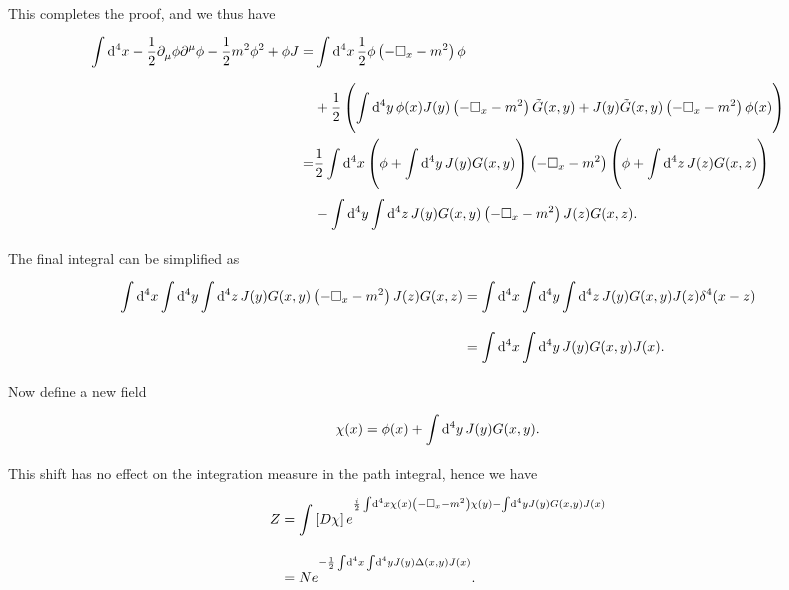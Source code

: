 This completes the proof, and we thus have
\begin{align*}
	\int\limits_{}^{}\dd[4]{x}-\frac{1}{2}\partial^{}_{\mu}\phi\partial^{\mu}_{}\phi - \frac{1}{2}m^{2}\phi^{2} + \phi J =& \int\limits_{}^{}\dd[4]{x}\frac{1}{2}\phi\left(-\square_{x} - m^{2}\right)\phi \\
	&+ \frac{1}{2}\left(\int\limits_{}^{}\dd[4]{y}\phi(x)J(y)\left(-\square_{x} - m^{2}\right)\tilde{G}(x, y) + J(y)\tilde{G}(x, y)\left(-\square_{x} - m^{2}\right)\phi(x)\right) \\
	=& \frac{1}{2}\int\limits_{}^{}\dd[4]{x}\left(\phi + \int\limits_{}^{}\dd[4]{y}J(y)G(x, y)\right)\left(-\square_{x} - m^{2}\right)\left(\phi + \int\limits_{}^{}\dd[4]{z}J(z)G(x, z)\right) \\
	 &- \int\limits_{}^{}\dd[4]{y}\int\limits_{}^{}\dd[4]{z}J(y)G(x, y)\left(-\square_{x} - m^{2}\right)J(z)G(x, z).
\end{align*}
The final integral can be simplified as
\begin{align*}
	\int\limits_{}^{}\dd[4]{x}\int\limits_{}^{}\dd[4]{y}\int\limits_{}^{}\dd[4]{z}J(y)G(x, y)\left(-\square_{x} - m^{2}\right)J(z)G(x, z) &= \int\limits_{}^{}\dd[4]{x}\int\limits_{}^{}\dd[4]{y}\int\limits_{}^{}\dd[4]{z}J(y)G(x, y)J(z)\delta^{4}(x - z) \\
	                           &= \int\limits_{}^{}\dd[4]{x}\int\limits_{}^{}\dd[4]{y}J(y)G(x, y)J(x).
\end{align*}
Now define a new field
\begin{align*}
	\chi(x) = \phi(x) + \int\limits_{}^{}\dd[4]{y}J(y)G(x, y).
\end{align*}
This shift has no effect on the integration measure in the path integral, hence we have
\begin{align*}
	Z &= \int\limits_{}\left[D\chi\right]e^{\frac{i}{2}\int\limits_{}^{}\dd[4]{x}\chi(x)\left(-\square_{x} - m^{2}\right)\chi(y) - \int\limits_{}^{}\dd[4]{y}J(y)G(x, y)J(x)} \\
	  &= Ne^{-\frac{1}{2}\int\limits_{}^{}\dd[4]{x}\int\limits_{}^{}\dd[4]{y}J(y)\Delta(x, y)J(x)}.
\end{align*}

